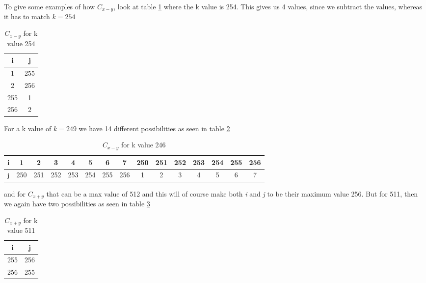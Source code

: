 To give some examples of how $C_{x-y}$, look at table \ref{tab:cxminusyk254} where the k value is 254. This gives us 4 values, since we subtract the values, whereas it has to match $k=254$

\begin{table}[H]
  \centering
    \begin{tabular}{|c|c|}
    \hline
    i & j \\ 
    \hline
    1     & 255 \\
    \hline
    2     & 256 \\
    \hline
    255   & 1 \\
    \hline
    256   & 2 \\
    \hline
    \end{tabular}%
  \caption{$C_{x-y}$ for k value 254}\label{tab:cxminusyk254}%
\end{table}%

For a k value of $k=249$ we have 14 different possibilities as seen in table \ref{tab:cxminusyk249}

\begin{table}[H]
  \centering
    \begin{tabular}{|c|c|c|c|c|c|c|c|c|c|c|c|c|c|c|}
    \hline
    i     & 1     & 2     & 3     & 4     & 5     & 6     & 7     & 250   & 251   & 252   & 253   & 254   & 255   & 256 \\
    \hline
    j     & 250   & 251   & 252   & 253   & 254   & 255   & 256   & 1     & 2     & 3     & 4     & 5     & 6     & 7 \\
    \hline
    \end{tabular}%
  \caption{$C_{x-y}$ for k value 246}\label{tab:cxminusyk249}%
\end{table}%

and for $C_{x+y}$ that can be a max value of 512 and this will of course make both \textit{i} and \textit{j} to be their maximum value 256. But for 511, then we again have two possibilities as seen in table \ref{tab:cxplusyk511}

\begin{table}[H]
  \centering
    \begin{tabular}{|c|c|}
    \hline
    i     & j \\
    \hline
    255   & 256 \\
    \hline
    256   & 255 \\
    \hline
    \end{tabular}%
  \caption{$C_{x+y}$ for k value 511}\label{tab:cxplusyk511}%
\end{table}%

